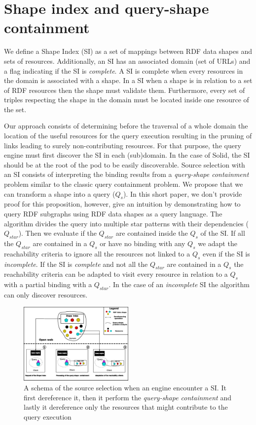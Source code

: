 \section{Shape index and query-shape containment}

We define a Shape Index (SI) as a set of mappings between RDF data shapes and sets of resources.
Additionally, an SI has an associated domain (set of URLs)
and a flag indicating if the SI is \emph{complete}.
A SI is complete when every resources in the domain is associated with a shape.
In a SI when a shape is in relation to a set of RDF resources then the shape must validate them.
Furthermore, every set of triples respecting the shape in the domain must be located inside one resource of the set.

Our approach consists of determining before the traversal of a whole domain the location of the useful resources for the query execution
resulting in the pruning of links leading to surely non-contributing resources.
For that purpose, the query engine must first discover the SI in each (sub)domain.
In the case of Solid, the SI should be at the root of the pod to be easily discoverable.
Source selection with an SI consists of interpreting the binding results from a \emph{query-shape containment} problem similar to the classic query containment problem.
We propose that we can transform a shape into a query ($Q_{s}$).
In this short paper, we don't provide proof for this proposition, however, 
\citeauthor{Delva2021} give an intuition by demonstrating how to query RDF subgraphs using RDF data shapes as a query language.
The algorithm divides the query into multiple star patterns with their dependencies ($Q_{star}$).
Then we evaluate if the  $Q_{star}$ are contained inside the $Q_s$ of the SI.
If all the $Q_{star}$ are contained in a $Q_{s}$ or have no binding with any $Q_{s}$
we adapt the reachability criteria to ignore all the resources not linked to a $Q_{s}$ even if the SI is \emph{incomplete}.
If the SI is \emph{complete} and not all the $Q_{star}$ are contained in a $Q_{s}$ the reachability criteria can be adapted
to visit every resource in relation to a $Q_{s}$ with a partial binding with a $Q_{star}$. 
In the case of an \emph{incomplete} SI the algorithm can only discover resources.

\begin{figure}[h]
    \centering
    \includegraphics[width=0.5\textwidth]{figure/shape_containement_v2}
    \caption{A schema of the source selection when an engine encounter a SI. It first dereference it, 
    then it perform the \emph{query-shape containment} and lastly it dereference only the resources that might contribute to the query execution}
    \label{fig:shape_index}
\end{figure}